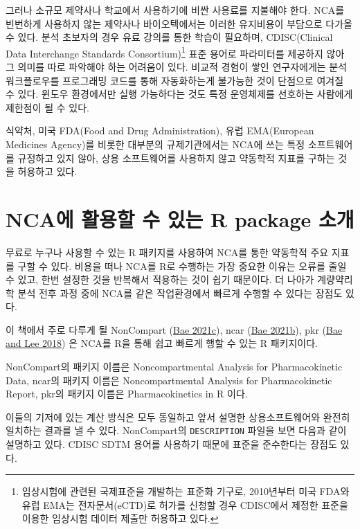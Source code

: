 \documentclass[
  11pt,
  krantz2, a4paper, twoside]{krantz}
\theoremstyle{definition}
\theoremstyle{definition}
\theoremstyle{definition}
\theoremstyle{definition}
\theoremstyle{remark}
\begin{document}
그러나 소규모 제약사나 학교에서 사용하기에 비싼 사용료를 지불해야 한다. NCA를 빈번하게 사용하지 않는 제약사나 바이오텍에서는 이러한 유지비용이 부담으로 다가올 수 있다.
분석 초보자의 경우 유료 강의를 통한 학습이 필요하며, CDISC(Clinical Data Interchange Standards Consortium)\footnote{임상시험에 관련된 국제표준을 개발하는 표준화 기구로, 2010년부터 미국 FDA와 유럽 EMA는 전자문서(eCTD)로 허가를 신청할 경우 CDISC에서 제정한 표준을 이용한 임상시험 데이터 제출만 허용하고 있다.} 표준 용어로 파라미터를 제공하지 않아 그 의미를 따로 파악해야 하는 어려움이 있다.
비교적 경험이 쌓인 연구자에게는 분석 워크플로우를 프로그래밍 코드를 통해 자동화하는게 불가능한 것이 단점으로 여겨질 수 있다.
윈도우 환경에서만 실행 가능하다는 것도 특정 운영체제를 선호하는 사람에게 제한점이 될 수 있다.

식약처, 미국 FDA(Food and Drug Administration), 유럽 EMA(European Medicines Agency)를 비롯한 대부분의 규제기관에서는 NCA에 쓰는 특정 소프트웨어를 규정하고 있지 않아, 상용 소프트웨어를 사용하지 않고 약동학적 지표를 구하는 것을 허용하고 있다.

\hypertarget{ncauxc5d0-uxd65cuxc6a9uxd560-uxc218-uxc788uxb294-r-package-uxc18cuxac1c}{%
\section{NCA에 활용할 수 있는 R package 소개}\label{ncauxc5d0-uxd65cuxc6a9uxd560-uxc218-uxc788uxb294-r-package-uxc18cuxac1c}}

무료로 누구나 사용할 수 있는 R 패키지를 사용하여 NCA를 통한 약동학적 주요 지표를 구할 수 있다. 비용을 떠나 NCA를 R로 수행하는 가장 중요한 이유는 오류를 줄일 수 있고, 한번 설정한 것을 반복해서 적용하는 것이 쉽기 때문이다. 더 나아가 계량약리학 분석 전후 과정 중에 NCA를 같은 작업환경에서 빠르게 수행할 수 있다는 장점도 있다.

이 책에서 주로 다루게 될 NonCompart (\protect\hyperlink{ref-R-NonCompart}{Bae 2021c}), ncar (\protect\hyperlink{ref-R-ncar}{Bae 2021b}), pkr (\protect\hyperlink{ref-R-pkr}{Bae and Lee 2018}) 은 NCA를 R을 통해 쉽고 빠르게 행할 수 있는 R 패키지이다.

NonCompart의 패키지 이름은 Noncompartmental Analysis for Pharmacokinetic Data,
ncar의 패키지 이름은 Noncompartmental Analysis for Pharmacokinetic Report,
pkr의 패키지 이름은 Pharmacokinetics in R 이다.

이들의 기저에 있는 계산 방식은 모두 동일하고 앞서 설명한 상용소프트웨어와 완전히 일치하는 결과를 낼 수 있다. NonCompart의 \texttt{DESCRIPTION} 파일을 보면 다음과 같이 설명하고 있다. CDISC SDTM 용어를 사용하기 때문에 표준을 준수한다는 장점도 있다.
\end{document}
